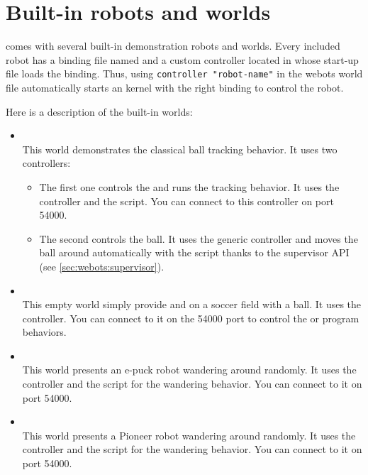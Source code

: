 \section{Built-in robots and worlds}

\uwebots comes with several built-in demonstration robots and
worlds. Every included robot has a binding file named
 and a
custom controller located in
 whose 
start-up file loads the binding. Thus, using \lstinline+controller "robot-name"+
in the webots world file automatically starts an \urbi
kernel with the right binding to control the robot.

Here is a description of the built-in worlds:

\begin{itemize}
\item {}\\
  This world demonstrates the \urbi classical \aibo ball tracking
  behavior. It uses two \urbi controllers:
  \begin{itemize}
  \item The first one controls the \aibo and runs the tracking
    behavior. It uses the  controller and the
     script. You can connect to this
    controller on port 54000.
  \item The second controls the ball. It uses the generic
     controller and moves the ball around automatically
    with the  script thanks to the supervisor
    API (see \autoref{sec:webots:supervisor}).
  \end{itemize}
\item {}\\
  This empty world simply provide and \aibo on a soccer field with a
  ball. It uses the  controller. You can connect to it on
  the 54000 port to control the \aibo or program behaviors.
\item {}\\
  This world presents an e-puck robot wandering around randomly. It
  uses the  controller and the 
  script for the wandering behavior. You can connect to it on port
  54000.
\item {}\\
  This world presents a Pioneer robot wandering around randomly. It
  uses the  controller and the 
  script for the wandering behavior. You can connect to it on port
  54000.
\end{itemize}

